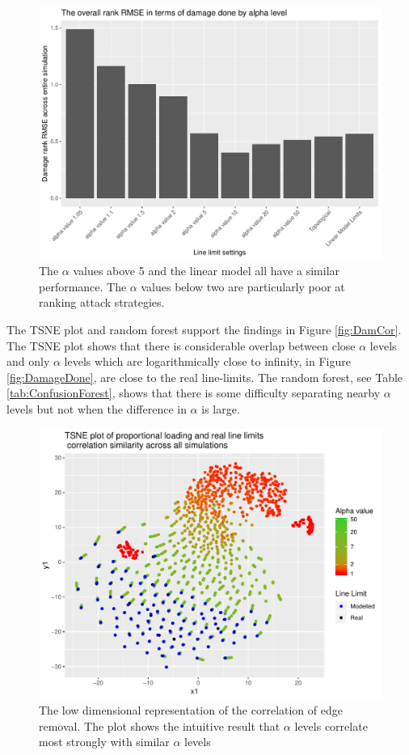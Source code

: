 \documentclass{article}
\begin{document}
\begin{figure}
    \centering
    \includegraphics{Figures/AttackStratRankPerf.pdf}
    \caption{The $\alpha$ values above 5 and the linear model all have a similar performance. The $\alpha$ values below two are particularly poor at ranking attack strategies.}
    \label{fig:AttackStratRankPerf}
\end{figure}



\iffalse
The TSNE plot and random forest support the findings in Figure \ref{fig:DamCor}. The TSNE plot shows that there is considerable overlap between close $\alpha$ levels and only $\alpha$ levels which are logarithmically close to infinity, in Figure \ref{fig:DamageDone}, are close to the real line-limits. The random forest, see Table \ref{tab:ConfusionForest}, shows that there is some difficulty separating nearby $\alpha$ levels but not when the difference in $\alpha$ is large. 


\begin{figure}
    \centering
    \includegraphics{Figures/TSNEcor.pdf}
    \caption{The low dimensional representation of the correlation of edge removal. The plot shows the intuitive result that $\alpha$ levels correlate most strongly with similar $\alpha$ levels}
    \label{fig:TSNE1}
\end{figure}
\end{document}
